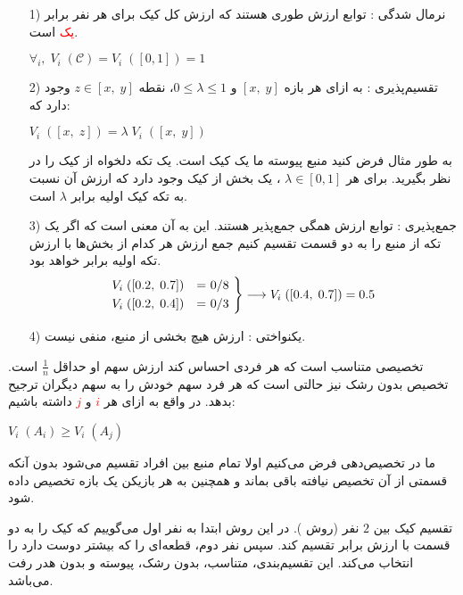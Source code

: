 \documentclass{article}
\begin{document}
\begin{itemize}
    \item[1)]
    نرمال شدگی 
    :
    توابع ارزش طوری هستند که ارزش کل کیک برای هر نفر برابر \textcolor{red}{یک} است.
    \begin{center}
        $\forall_i,\; V_i\;(\mathcal{C}) = V_i\;([0, 1]) = 1$
    \end{center}

    \item[2)]
    تقسیم‌پذیری
    :
     به ازای هر بازه $[x,\; y]$ و 
    $0 \leq \lambda \leq 1$،
    نقطه $z \in [x,\; y]$ وجود دارد که:
    \begin{center}
        $V_i\;([x,\; z]) = \lambda \; V_i\;([x,\; y])$
    \end{center}
    به طور مثال
    فرض کنید منبع پیوسته ما یک کیک است.
    یک تکه دلخواه از کیک را در نظر بگیرید.
    برای هر
    $
    \lambda \in [0, 1]
    $
    ،
    یک بخش از کیک وجود دارد که ارزش آن نسبت به تکه کیک اولیه برابر 
    $
    \lambda
    $
    است.
    \item[3)]
    جمع‌پذیری
    :
    توابع ارزش همگی جمع‌پذیر هستند.
    این به آن معنی است که اگر یک تکه از منبع را به دو قسمت تقسیم کنیم جمع ارزش هر کدام از بخش‌ها با ارزش تکه اولیه برابر خواهد بود.
    \[
    \begin{rcases*}
    V_i\;([0.2, \; 0.7]) &= 0/8 \\
    V_i\;([0.2, \; 0.4]) &= 0/3
    \end{rcases*} \longrightarrow V_i\;([0.4, \; 0.7]) = 0.5
    \]

    \item[4)]
    یکنواختی
    :
    ارزش هیچ بخشی از منبع، منفی نیست.
\end{itemize}


تخصیصی 
متناسب 
است که هر فردی احساس کند ارزش سهم او حداقل 
{$\frac{1}{n}$} است.
تخصیص بدون رشک
نیز حالتی است که هر فرد سهم خودش را به سهم دیگران ترجیح بدهد.
در واقع به ازای هر \textcolor{red}{$i$} و \textcolor{red}{$j$} داشته باشیم:
\begin{center}
    $V_i\;(A_i) \geq V_i\;(A_j)$
\end{center}
ما در تخصیص‌دهی فرض می‌کنیم
اولا تمام منبع بین افراد تقسیم می‌شود بدون آنکه قسمتی از آن تخصیص نیافته باقی بماند و همچنین  به هر بازیکن یک بازه تخصیص داده شود.

\begin{example}
    تقسیم کیک بین
    $2$
    نفر 
    (روش
    ).
    در این روش ابتدا به نفر اول می‌گوییم که کیک را به دو قسمت با ارزش برابر تقسیم کند. سپس نفر دوم، قطعه‌ای را که بیشتر دوست دارد را انتخاب می‌کند. این تقسیم‌بندی، متناسب، بدون رشک، پیوسته و بدون هدر رفت می‌باشد.
\end{example}
\end{document}
